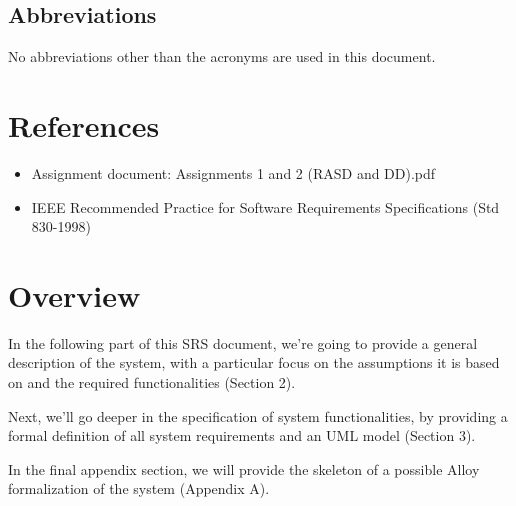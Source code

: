 \subsection{Abbreviations}
No abbreviations other than the acronyms are used in this document.


\section{References}
\begin{itemize}
\item Assignment document: Assignments 1 and 2 (RASD and DD).pdf
\item IEEE Recommended Practice for Software Requirements Specifications (Std 830-1998)
\end{itemize}


\section{Overview}
In the following part of this SRS document, we're going to provide a general description of the system, with a particular focus on the assumptions it is based on and the required functionalities (Section 2).

Next, we'll go deeper in the specification of system functionalities, by providing a formal definition of all system requirements and an UML model (Section 3).

In the final appendix section, we will provide the skeleton of a possible Alloy formalization of the system (Appendix A). 

